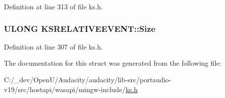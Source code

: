 Definition at line 313 of file ks.\+h.

\subsubsection[{\texorpdfstring{Size}{Size}}]{\setlength{\rightskip}{0pt plus 5cm}U\+L\+O\+NG K\+S\+R\+E\+L\+A\+T\+I\+V\+E\+E\+V\+E\+N\+T\+::\+Size}\hypertarget{struct_k_s_r_e_l_a_t_i_v_e_e_v_e_n_t_a4f2b373b6251ad6f8fac52676c94a430}{}\label{struct_k_s_r_e_l_a_t_i_v_e_e_v_e_n_t_a4f2b373b6251ad6f8fac52676c94a430}


Definition at line 307 of file ks.\+h.



The documentation for this struct was generated from the following file\+:\begin{DoxyCompactItemize}
\item 
C\+:/\+\_\+dev/\+Open\+U/\+Audacity/audacity/lib-\/src/portaudio-\/v19/src/hostapi/wasapi/mingw-\/include/\hyperlink{ks_8h}{ks.\+h}\end{DoxyCompactItemize}
